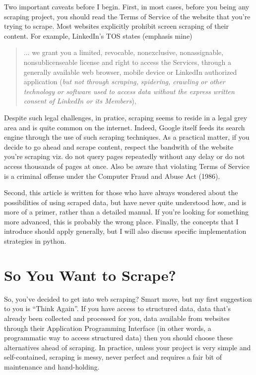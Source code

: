 \documentclass[12pt]{article}
\begin{document}
Two important caveats before I begin. First, in most cases, before you being any scraping project, you should read the Terms of Service of the website that you're trying to scrape. Most websites explicitly prohibit screen scraping of their content. For example, LinkedIn's TOS states (emphasis mine)

\begin{quote}
... we grant you a limited, revocable, nonexclusive, nonassignable, nonsublicenseable license and right to access the Services, through a generally available web browser, mobile device or LinkedIn authorized application (\emph{but not through scraping, spidering, crawling or other technology or software used to access data without the express written consent of LinkedIn or its Members}), 
\end{quote}

Despite such legal challenges, in pratice, scraping seems to reside in a legal grey area and is quite common on the internet. Indeed, Google itself feeds its search engine through the use of such scraping techniques. As a practical matter, if you decide to go ahead and scrape content, respect the bandwith of the website you're scraping viz. do not query pages repeatedly without any delay or do not access thousands of pages at once. Also be aware that violating Terms of Service is a criminal offense under the Computer Fraud and Abuse Act (1986).

Second, this article is written for those who have always wondered about the possibilities of using scraped data, but have never quite understood how, and is more of a primer, rather than a detailed manual. If you're looking for something more advanced, this is probably the wrong place. Finally, the concepts that I introduce should apply generally, but I will also discuss specific implementation strategies in python. 

\section{So You Want to Scrape?}

So, you've decided to get into web scraping? Smart move, but my first suggestion to you is ``Think Again''. If you have access to structured data, data that's already been collected and processed for you, data available from websites through their Application Programming Interface (in other words, a programmatic way to access structured data) then you should choose these alternatives ahead of scraping. In practice, unless your project is very simple and self-contained, scraping is messy, never perfect and requires a fair bit of maintenance and hand-holding. 
\end{document}
